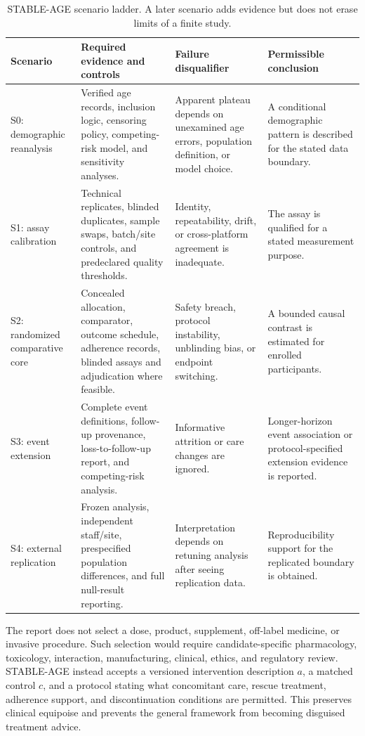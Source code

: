 \documentclass[10pt,conference]{IEEEtran}
\begin{document}
\begin{table}[!t]
\caption{STABLE-AGE scenario ladder. A later scenario adds evidence but does not erase limits of a finite study.}
\label{tab:scenario-ladder}
\centering
\footnotesize
\begin{tabular}{@{}p{}p{}p{}p{}@{}}
\toprule
Scenario & Required evidence and controls & Failure disqualifier & Permissible conclusion \\
\midrule
S0: demographic reanalysis & Verified age records, inclusion logic, censoring policy, competing-risk model, and sensitivity analyses. & Apparent plateau depends on unexamined age errors, population definition, or model choice. & A conditional demographic pattern is described for the stated data boundary. \\
S1: assay calibration & Technical replicates, blinded duplicates, sample swaps, batch/site controls, and predeclared quality thresholds. & Identity, repeatability, drift, or cross-platform agreement is inadequate. & The assay is qualified for a stated measurement purpose. \\
S2: randomized comparative core & Concealed allocation, comparator, outcome schedule, adherence records, blinded assays and adjudication where feasible. & Safety breach, protocol instability, unblinding bias, or endpoint switching. & A bounded causal contrast is estimated for enrolled participants. \\
S3: event extension & Complete event definitions, follow-up provenance, loss-to-follow-up report, and competing-risk analysis. & Informative attrition or care changes are ignored. & Longer-horizon event association or protocol-specified extension evidence is reported. \\
S4: external replication & Frozen analysis, independent staff/site, prespecified population differences, and full null-result reporting. & Interpretation depends on retuning analysis after seeing replication data. & Reproducibility support for the replicated boundary is obtained. \\
\bottomrule
\end{tabular}
\end{table}

The report does not select a dose, product, supplement, off-label medicine, or invasive procedure. Such selection would require candidate-specific pharmacology, toxicology, interaction, manufacturing, clinical, ethics, and regulatory review. STABLE-AGE instead accepts a versioned intervention description $a$, a matched control $c$, and a protocol stating what concomitant care, rescue treatment, adherence support, and discontinuation conditions are permitted. This preserves clinical equipoise and prevents the general framework from becoming disguised treatment advice.
\end{document}
